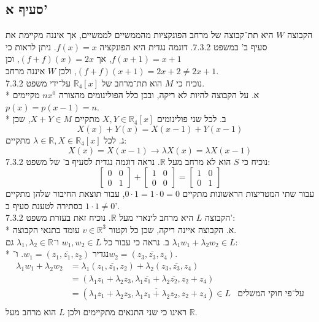 \documentclass[a4paper,10pt]{article}
\def\RR{\mathbb{R}}
\begin{document}
	\subsection{סעיף א'}
	הקבוצה $W$ היא תת־קבוצה של מרחב הפונקציות מהממשיים לממשיים,
	אך איננה מקיימת את סעיף ב' במשפט 7.3.2.
	דוגמה נגדית היא הפונקציה $f(x) = x$. ניתן לראות כי $f(x + 1) = x + 1$,
	אך $(f + f)(x) = 2x$, וכן $(f+f)(x + 1) = 2x + 2 \ne 2x + 1$,
	ולכן $W$ איננה מרחב. \\
	נוכיח כי $M$ הוא תת־מרחב של $\RR_4[x]$ על־ידי משפט 7.3.2. \\*
	א. על הקבוצה להיות לא ריקה, ובכן כלל הפולינומים מהצורה $nx^0$ מקיימים $p(x) = p(x - 1) = n$. \\*
	ב. לכל שני פולינומים $X, Y \in \RR_4[x]$ מתקיים $X + Y \in M$, שכן
	\[
		X(x) + Y(x) = X(x - 1) + Y(x - 1)
	\]
	ג. לכל $\lambda \in \RR, X \in \RR_4[x]$ מתקיים:
	\[
		X(x) = X(x - 1) \rightarrow
		\lambda X(x) = \lambda X(x - 1)
	\]
	נוכיח כי $S$ הוא לא מרחב מעל $\RR$.
	נראה דוגמה נגדית לסעיף ב' של משפט 7.3.2:
	\[
		\begin{bmatrix}
			0 & 0 \\
			0 & 1
		\end{bmatrix}
		+
		\begin{bmatrix}
			1 & 0 \\
			0 & 0
		\end{bmatrix}
		=
		\begin{bmatrix}
			1 & 0 \\
			0 & 1
		\end{bmatrix}
	\]
	עבור שתי המטריצות הראשונות מתקיים $0 \cdot 1 = 1 \cdot 0 = 0$,
	עבור תוצאת החיבור שלהן מתקיים $1 \cdot 1 \ne 0$ בסתירה לטענת סעיף ב'.\\
	הקבוצה $L$ היא מרחב לינארי מעל $\RR$.
	נוכיח זאת בעזרת משפט 7.3.2':\\*
	א. הקבוצה איינה ריקה, שכן כל וקטור $v \in \RR^3$ עומד בתנאי הקבוצה. \\
	ב. נראה כי עבור כל $w_1, w_2 \in L$ ו־$\lambda_1, \lambda_2 \in \RR$
	גם $\lambda_1 w_1 + \lambda_2 w_2 \in L$: \\*
	נגדיר $w_1 = (z_1, \overline{z_1}, z_2)$.
	ו־$w_2 = (z_3, \overline{z_3}, z_4)$.
	\begin{align*}
		\lambda_1 w_1 + \lambda_2 w_2
		& = \lambda_1 (z_1, \overline{z_1}, z_2)
		+ \lambda_2 (z_3, \overline{z_3}, z_4) \\
		& = (\lambda_1 z_1 + \lambda_2 z_3,
		\lambda_1 \overline{z_1} + \lambda_2 \overline{z_2},
		z_2 + z_4) \\
		& = (\lambda_1 z_1 + \lambda_2 z_3,
		\overline{\lambda_1 z_1 + \lambda_2 z_2},
		z_2 + z_4) \in L
		& \text{על־פי חוקי המשלים} \\
	\end{align*}
	ראינו כי שני התנאים מתקיימים ולכן $L$ הוא מרחב מעל $\RR$.
\end{document}
